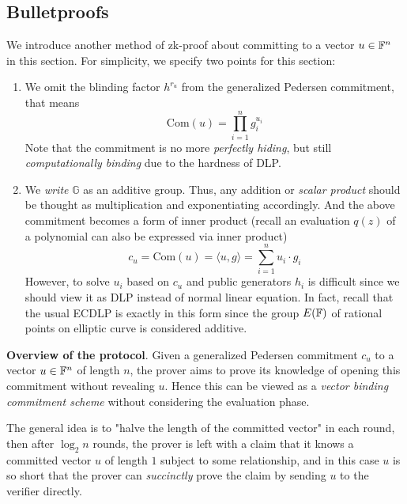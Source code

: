 \documentclass{article}
\begin{document}
\subsection{Bulletproofs}

We introduce another method of zk-proof about committing to a vector $u \in \mathbb{F}^n$ in this section. For simplicity, we specify two points for this section: 
\begin{enumerate}
\item\label{item:87} We omit the blinding factor $h^{r_u}$ from the generalized Pedersen commitment, that means
\begin{equation*}
\text{Com}(u) = \prod_{i = 1}^n g_i^{u_i}
\end{equation*} 
Note that the commitment is no more \textit{perfectly hiding}, but still \textit{computationally binding} due to the hardness of DLP. 
\item\label{item:88} We \textit{write} $\mathbb{G}$ as an additive group. Thus, any addition or \textit{scalar product} should be thought as multiplication and exponentiating accordingly. And the above commitment becomes a form of inner product (recall an evaluation $q(z)$ of a polynomial can also be expressed via inner product)
\begin{equation*}
c_u = \text{Com}(u) = \langle u, g \rangle = \sum_{i = 1}^n u_i \cdot g_i
\end{equation*}
However, to solve $u_i$ based on  $c_u$ and public generators $h_i$ is difficult since we should view it as DLP instead of normal linear equation. In fact, recall that the usual ECDLP is exactly in this form since the group $E(\mathbb{F})$ of rational points on elliptic curve is considered additive.
\end{enumerate}

\textbf{Overview of the protocol}. Given a generalized Pedersen commitment $c_u$ to a vector $u \in \mathbb{F}^n$ of length $n$, the prover aims to prove its knowledge of opening this commitment without revealing $u$. Hence this can be viewed as a \textit{vector binding commitment scheme} without considering the evaluation phase. 

The general idea is to "halve the length of the committed vector" in each round, then after $\log_2 n$ rounds, the prover is left with a claim that it knows a committed vector $u$ of length $1$ subject to some relationship, and in this case $u$ is so short that the prover can \textit{succinctly} prove the claim by sending $u$ to the verifier directly. 
\end{document}
